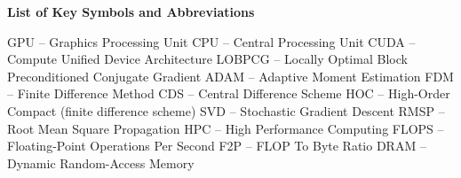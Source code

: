 \noindent
\begingroup
    \fontsize{12pt}{1.5pt}\selectfont
    \textbf{List of Key Symbols and Abbreviations}
\endgroup

\vspace{3mm}

\noindent GPU -- Graphics Processing Unit\newline
CPU -- Central Processing Unit\newline
CUDA -- Compute Unified Device Architecture\newline
LOBPCG -- Locally Optimal Block Preconditioned Conjugate Gradient\newline
ADAM -- Adaptive Moment Estimation\newline
FDM -- Finite Difference Method\newline
CDS -- Central Difference Scheme\newline
HOC -- High-Order Compact (finite difference scheme)\newline
SVD -- Stochastic Gradient Descent \newline
RMSP -- Root Mean Square Propagation\newline
HPC -- High Performance Computing\newline
FLOPS -- Floating-Point Operations Per Second\newline
F2P -- FLOP To Byte Ratio\newline
DRAM -- Dynamic Random-Access Memory




